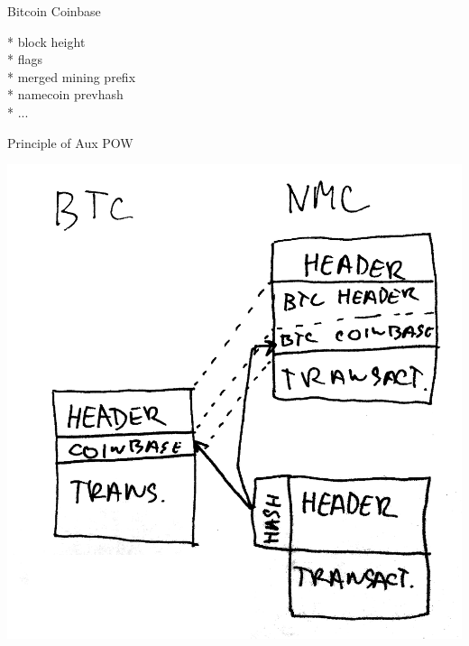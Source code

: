 \documentclass{beamer}
\begin{document}
\begin{frame}

    {\Huge Bitcoin Coinbase}\\

    \vspace{5mm}

    * block height\\
    * flags\\
    * merged mining prefix\\
    * namecoin prevhash\\
    * ...\\

\end{frame}

\begin{frame}

    {\Huge Principle of Aux POW}\\

\end{frame}

\begin{frame}

    \includegraphics[scale=0.185]{img/principle_of_auxpow}

\end{frame}
\end{document}
